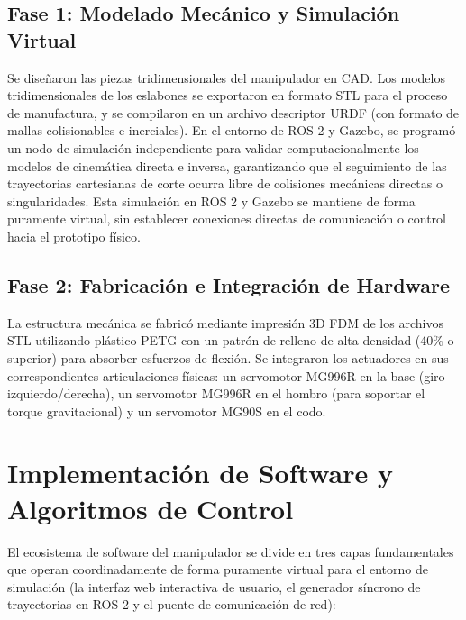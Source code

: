 \documentclass[conference,a4paper]{IEEEtran}
\begin{document}
\subsection{Fase 1: Modelado Mecánico y Simulación Virtual}
Se diseñaron las piezas tridimensionales del manipulador en CAD. Los modelos tridimensionales de los eslabones se exportaron en formato STL para el proceso de manufactura, y se compilaron en un archivo descriptor URDF (con formato de mallas colisionables e inerciales). En el entorno de ROS 2 y Gazebo, se programó un nodo de simulación independiente para validar computacionalmente los modelos de cinemática directa e inversa, garantizando que el seguimiento de las trayectorias cartesianas de corte ocurra libre de colisiones mecánicas directas o singularidades. Esta simulación en ROS 2 y Gazebo se mantiene de forma puramente virtual, sin establecer conexiones directas de comunicación o control hacia el prototipo físico.

\subsection{Fase 2: Fabricación e Integración de Hardware}
La estructura mecánica se fabricó mediante impresión 3D FDM de los archivos STL utilizando plástico PETG con un patrón de relleno de alta densidad (40\% o superior) para absorber esfuerzos de flexión. Se integraron los actuadores en sus correspondientes articulaciones físicas: un servomotor MG996R en la base (giro izquierdo/derecha), un servomotor MG996R en el hombro (para soportar el torque gravitacional) y un servomotor MG90S en el codo.


\section{Implementación de Software y Algoritmos de Control}
El ecosistema de software del manipulador se divide en tres capas fundamentales que operan coordinadamente de forma puramente virtual para el entorno de simulación (la interfaz web interactiva de usuario, el generador síncrono de trayectorias en ROS 2 y el puente de comunicación de red):
\end{document}
